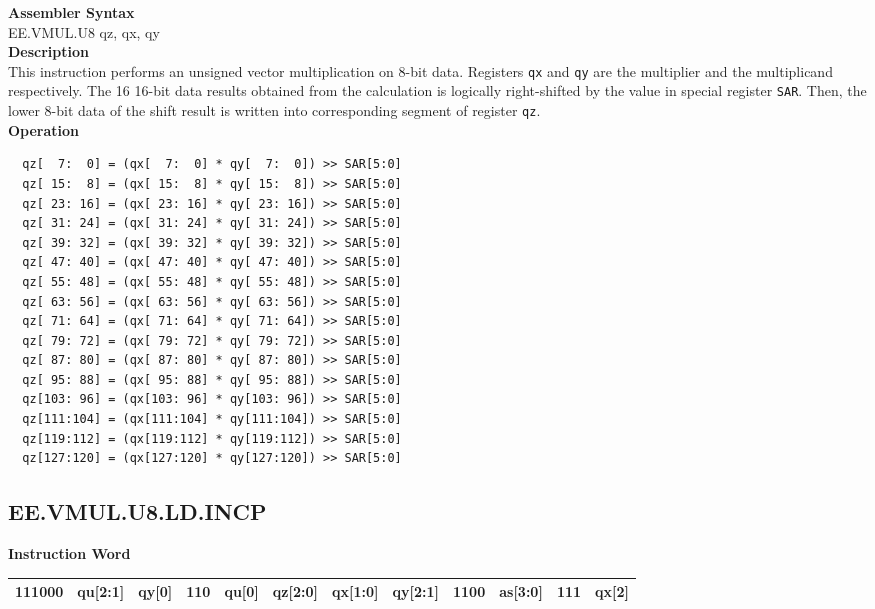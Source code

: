 \textbf{Assembler Syntax} \\
EE.VMUL.U8 qz, qx, qy \\
\textbf{Description} \\
This instruction performs an unsigned vector multiplication on 8-bit data. Registers \lstinline{qx} and \lstinline{qy} are the multiplier and the multiplicand respectively. The 16 16-bit data results obtained from the calculation is logically right-shifted by the value in special register \lstinline{SAR}. Then, the lower 8-bit data of the shift result is written into corresponding segment of register \lstinline{qz}.\\
\textbf{Operation}
\begin{lstlisting}
  qz[  7:  0] = (qx[  7:  0] * qy[  7:  0]) >> SAR[5:0]
  qz[ 15:  8] = (qx[ 15:  8] * qy[ 15:  8]) >> SAR[5:0]
  qz[ 23: 16] = (qx[ 23: 16] * qy[ 23: 16]) >> SAR[5:0]
  qz[ 31: 24] = (qx[ 31: 24] * qy[ 31: 24]) >> SAR[5:0]
  qz[ 39: 32] = (qx[ 39: 32] * qy[ 39: 32]) >> SAR[5:0]
  qz[ 47: 40] = (qx[ 47: 40] * qy[ 47: 40]) >> SAR[5:0]
  qz[ 55: 48] = (qx[ 55: 48] * qy[ 55: 48]) >> SAR[5:0]
  qz[ 63: 56] = (qx[ 63: 56] * qy[ 63: 56]) >> SAR[5:0]
  qz[ 71: 64] = (qx[ 71: 64] * qy[ 71: 64]) >> SAR[5:0]
  qz[ 79: 72] = (qx[ 79: 72] * qy[ 79: 72]) >> SAR[5:0]
  qz[ 87: 80] = (qx[ 87: 80] * qy[ 87: 80]) >> SAR[5:0]
  qz[ 95: 88] = (qx[ 95: 88] * qy[ 95: 88]) >> SAR[5:0]
  qz[103: 96] = (qx[103: 96] * qy[103: 96]) >> SAR[5:0]
  qz[111:104] = (qx[111:104] * qy[111:104]) >> SAR[5:0]
  qz[119:112] = (qx[119:112] * qy[119:112]) >> SAR[5:0]
  qz[127:120] = (qx[127:120] * qy[127:120]) >> SAR[5:0]
\end{lstlisting}

\clearpage
\subsection{EE.VMUL.U8.LD.INCP}\label{instruction:EEVMULU8LDINCP}
\setlength\tabcolsep{6pt}
\textbf{Instruction Word} \\
\begin{tabular}{|c|c|c|c|c|c|c|c|c|c|c|c|}
	\hline
	111000 & qu[2:1] & qy[0] & 110 & qu[0] & qz[2:0] & qx[1:0] & qy[2:1] & 1100 & as[3:0] & 111 & qx[2] \\
	\hline
\end{tabular}

